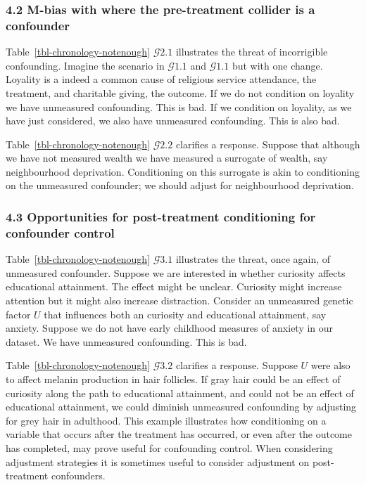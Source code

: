 \documentclass[
  single column]{article}
\begin{document}
\subsubsection{4.2 M-bias with where the pre-treatment collider is a
confounder}\label{m-bias-with-where-the-pre-treatment-collider-is-a-confounder}

Table~\ref{tbl-chronology-notenough} \(\mathcal{G} 2.1\) illustrates the
threat of incorrigible confounding. Imagine the scenario in
\(\mathcal{G} 1.1\) and \(\mathcal{G} 1.1\) but with one change.
Loyality is a indeed a common cause of religious service attendance, the
treatment, and charitable giving, the outcome. If we do not condition on
loyality we have unmeasured confounding. This is bad. If we condition on
loyality, as we have just considered, we also have unmeasured
confounding. This is also bad.

Table~\ref{tbl-chronology-notenough} \(\mathcal{G} 2.2\) clarifies a
response. Suppose that although we have not measured wealth we have
measured a surrogate of wealth, say neighbourhood deprivation.
Conditioning on this surrogate is akin to conditioning on the unmeasured
confounder; we should adjust for neighbourhood deprivation.

\subsubsection{4.3 Opportunities for post-treatment conditioning for
confounder
control}\label{opportunities-for-post-treatment-conditioning-for-confounder-control}

Table~\ref{tbl-chronology-notenough} \(\mathcal{G} 3.1\) illustrates the
threat, once again, of unmeasured confounder. Suppose we are interested
in whether curiosity affects educational attainment. The effect might be
unclear. Curiosity might increase attention but it might also increase
distraction. Consider an unmeasured genetic factor \(U\) that influences
both an curiosity and educational attainment, say anxiety. Suppose we do
not have early childhood measures of anxiety in our dataset. We have
unmeasured confounding. This is bad.

Table~\ref{tbl-chronology-notenough} \(\mathcal{G} 3.2\) clarifies a
response. Suppose \(U\) were also to affect melanin production in hair
follicles. If gray hair could be an effect of curiosity along the path
to educational attainment, and could not be an effect of educational
attainment, we could diminish unmeasured confounding by adjusting for
grey hair in adulthood. This example illustrates how conditioning on a
variable that occurs after the treatment has occurred, or even after the
outcome has completed, may prove useful for confounding control. When
considering adjustment strategies it is sometimes useful to consider
adjustment on post-treatment confounders.
\end{document}
